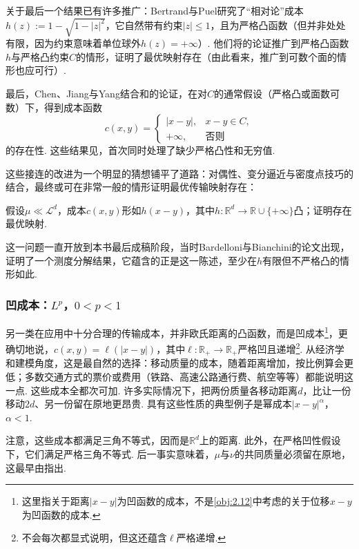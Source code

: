 关于最后一个结果已有许多推广：Bertrand与Puel\cite{b52}研究了“相对论”成本$h(z):=1-\sqrt{1-|z|^2}$，它自然带有约束$|z|\le1$，且为严格凸函数（但并非处处有限，因为约束意味着单位球外$h(z)=+\infty$）. 他们将\cite{b122,b197}的论证推广到严格凸函数$h$与严格凸约束$C$的情形，证明了最优映射存在（由此看来，推广到可数个面的情形也应可行）.

最后，Chen、Jiang与Yang结合\cite{b197}和\cite{b120}的论证，在对$C$的通常假设（严格凸或面数可数）下，得到成本函数
\[
c(x,y)=\begin{cases}|x-y|,&x-y\in C,\\+\infty,&\text{否则}\end{cases}
\]
的存在性. 这些结果见\cite{b123,b124}，首次同时处理了缺少严格凸性和无穷值.

这些接连的改进为一个明显的猜想铺平了道路：对偶性、变分逼近与密度点技巧的结合，最终或可在非常一般的情形证明最优传输映射存在：
\begin{problem*}[每个凸成本的存在性]
假设$\mu\ll\mathscr L^d$，成本$c(x,y)$形如$h(x-y)$，其中$h:\mathbb R^d\to\mathbb R\cup\{+\infty\}$凸；证明存在最优映射.
\end{problem*}
这一问题一直开放到本书最后成稿阶段，当时Bardelloni与Bianchini的论文\cite{b26}出现，证明了一个测度分解结果，它蕴含的正是这一陈述，至少在$h$有限但不严格凸的情形如此.

\subsubsection[凹成本]{凹成本：$L^p$，$0<p<1$}\label{sec:3.3.2}
另一类在应用中十分合理的传输成本，并非欧氏距离的凸函数，而是凹成本\footnote{这里指关于距离$|x-y|$为凹函数的成本，不是\autoref{obj:2.12}中考虑的关于位移$x-y$为凹函数的成本.}，更确切地说，$c(x,y)=\ell(|x-y|)$，其中$\ell:\mathbb R_+\to\mathbb R_+$严格凹且递增\footnote{不会每次都显式说明，但这还蕴含$\ell$严格递增.}. 从经济学和建模角度，这是最自然的选择：移动质量的成本，随着距离增加，按比例算会更低；多数交通方式的票价或费用（铁路、高速公路通行费、航空等等）都能说明这一点. \label{idx:i145-p114}
这些成本全都次可加. 许多实际情况下，把两份质量各移动距离$d$，比让一份移动$2d$、另一份留在原地更昂贵. 具有这些性质的典型例子是幂成本$|x-y|^\alpha$，$\alpha<1$.

\label{idx:i44-p114}
注意，这些成本都满足三角不等式，因而是$\mathbb R^d$上的距离. 此外，在严格凹性假设下，它们满足严格三角不等式. 后一事实意味着，$\mu$与$\nu$的共同质量必须留在原地，这最早由\cite{b176}指出.

